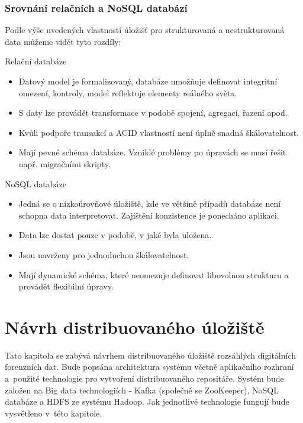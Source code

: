 \subsection{Srovnání relačních a NoSQL databází}
Podle výše uvedených vlastností úložišť pro strukturovaná a nestrukturovaná data můžeme vidět tyto rozdíly:

\begin{multicols}{2}

Relační databáze

\begin{itemize}
    \item Datový model je formalizovaný, databáze umožňuje definovat integritní omezení, kontroly, model reflektuje elementy reálného světa.
    
    \item S daty lze provádět transformace v podobě spojení, agregací, řazení apod.
    
    \item Kvůli podpoře transakcí a ACID vlastností není úplně snadná škálovatelnost.
    
    \item Mají pevné schéma databáze. Vzniklé problémy po úpravách se musí řešit např. migračními skripty.
\end{itemize}

\columnbreak

NoSQL databáze

\begin{itemize}
    \item Jedná se o nízkoúrovňové úložiště, kde ve většině případů databáze není schopna data interpretovat. Zajištění konzistence je ponecháno aplikaci. 
    
    \item Data lze dostat pouze v podobě, v jaké byla uložena.
    
    \item Jsou navrženy pro jednoduchou škálovatelnost.
    
    \item Mají dynamické schéma, které neomezuje definovat libovolnou strukturu a provádět flexibilní úpravy.
\end{itemize}

\end{multicols}

\chapter{Návrh distribuovaného úložiště} \label{distrRepDesignChapter}
Tato kapitola se zabývá návrhem distribuovaného úložiště rozsáhlých digitálních forenzních dat. Bude popsána architektura systému včetně aplikačního rozhraní a~použité technologie pro vytvoření distribuovaného repositáře.
Systém bude založen na Big data technologiích - Kafka (společně se ZooKeeper), NoSQL databáze a HDFS ze systému Hadoop. Jak jednotlivé technologie fungují bude vysvětleno v~této kapitole.

